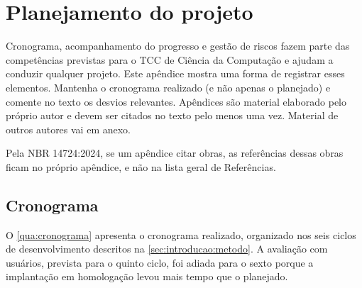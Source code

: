 \chapter{Planejamento do projeto}
\label{ap:planejamento}

\begin{instrucao}
Cronograma, acompanhamento do progresso e gestão de riscos fazem parte das
competências previstas para o TCC de Ciência da Computação e ajudam a conduzir
qualquer projeto. Este apêndice mostra uma forma de registrar
esses elementos. Mantenha o cronograma realizado (e não apenas o planejado) e
comente no texto os desvios relevantes. Apêndices são material elaborado pelo
próprio autor e devem ser citados no texto pelo menos uma vez. Material de
outros autores vai em anexo.

Pela NBR 14724:2024, se um apêndice citar obras, as referências dessas obras
ficam no próprio apêndice, e não na lista geral de Referências.
\end{instrucao}

\section{Cronograma}

O \cref{qua:cronograma} apresenta o cronograma realizado, organizado nos seis
ciclos de desenvolvimento descritos na \cref{sec:introducao:metodo}. A
avaliação com usuários, prevista para o quinto ciclo, foi adiada para o sexto
porque a implantação em homologação levou mais tempo que o planejado.


